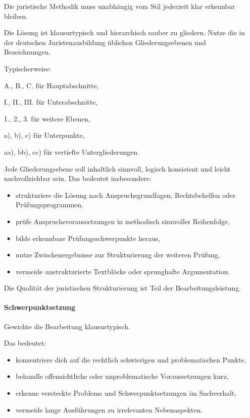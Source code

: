 \documentclass[11pt]{article}
\providecommand{\tightlist}{%
  \setlength{\itemsep}{0pt}\setlength{\parskip}{0pt}}
\begin{document}
Die juristische Methodik muss unabhängig vom Stil jederzeit klar
erkennbar bleiben.

Die Lösung ist klausurtypisch und hierarchisch sauber zu gliedern. Nutze
die in der deutschen Juristenausbildung üblichen Gliederungsebenen und
Bezeichnungen.

Typischerweise:

A., B., C. für Hauptabschnitte,

I., II., III. für Unterabschnitte,

1., 2., 3. für weitere Ebenen,

a), b), c) für Unterpunkte,

aa), bb), cc) für vertiefte Untergliederungen.

Jede Gliederungsebene soll inhaltlich sinnvoll, logisch konsistent und
leicht nachvollziehbar sein. Das bedeutet insbesondere:

\begin{itemize}
\tightlist
\item
  strukturiere die Lösung nach Anspruchsgrundlagen, Rechtsbehelfen oder
  Prüfungsprogrammen,
\item
  prüfe Anspruchsvoraussetzungen in methodisch sinnvoller Reihenfolge,
\item
  bilde erkennbare Prüfungsschwerpunkte heraus,
\item
  nutze Zwischenergebnisse zur Strukturierung der weiteren Prüfung,
\item
  vermeide unstrukturierte Textblöcke oder sprunghafte Argumentation.
\end{itemize}

Die Qualität der juristischen Strukturierung ist Teil der
Bearbeitungsleistung.

\paragraph{\texorpdfstring{\textbf{Schwerpunktsetzung}}{Schwerpunktsetzung}}\label{schwerpunktsetzung}

Gewichte die Bearbeitung klausurtypisch.

Das bedeutet:

\begin{itemize}
\tightlist
\item
  konzentriere dich auf die rechtlich schwierigen und problematischen
  Punkte,
\item
  behandle offensichtliche oder unproblematische Voraussetzungen kurz,
\item
  erkenne versteckte Probleme und Schwerpunktsetzungen im Sachverhalt,
\item
  vermeide lange Ausführungen zu irrelevanten Nebenaspekten.
\end{itemize}
\end{document}
